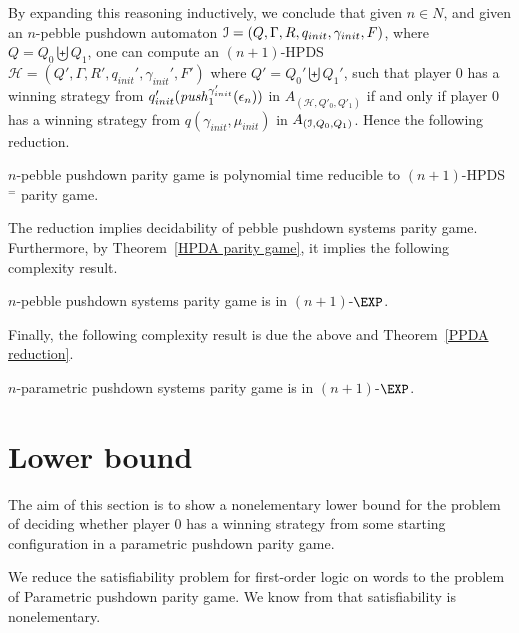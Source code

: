 \documentclass[a4paper,UKenglish,cleveref, autoref, thm-restate]{lipics-v2021}
\renewcommand{\H}{\mathcal{H}}
\begin{document}
{By expanding this reasoning inductively, we conclude that given $n \in N$, and
given an $n$-pebble pushdown automaton 
$\mathcal{I} = (Q, \Gamma, R, q_{init}, \gamma_{init}, F)$, where $Q= Q_0 \biguplus Q_1$,
one can compute an $(n+1)$-HPDS 
$\H = (Q', \Gamma, R', q_{init}', \gamma_{init}', F')$  where $Q'= Q_0' \biguplus Q_1'$, 
such 
that 
player $0$ has a winning strategy from $q'_{init}(\text{\textit{push}}_1^{\gamma_{init}'}(\epsilon_{n}))$ in $A_{(\H,Q'_0,Q'_1)}$ 
if
and only if
player $0$ has a winning strategy from $q(\gamma_{init},\mu_{init})$ in $A_{(\mathcal{I},Q_0,Q_1)}$. 
Hence the following reduction.

\begin{theorem} 
{\sc $n$-pebble pushdown parity game} is polynomial time reducible
to {\sc $(n+1)$-HPDS$^=$ parity game}.
\end{theorem}

The reduction implies decidability of pebble pushdown systems parity game. Furthermore,
by Theorem~\ref{HPDA parity game}, it implies the following complexity result.


\begin{theorem}
{\sc $n$-pebble pushdown systems parity game} is in $(n+1)$-$\EXP$.
\end{theorem}

Finally, the following complexity result is due the above and Theorem~\ref{PPDA reduction}.

\begin{corollary}
{\sc $n$-parametric pushdown systems parity game} is in $(n+1)$-$\EXP$.
\end{corollary}













\section{Lower bound}

The aim of this section is to show a nonelementary lower bound for the 
problem of deciding whether player $0$ has a winning strategy from some starting configuration in
a parametric pushdown parity game.

We reduce the satisfiability problem for first-order logic on words
to the problem of {\sc Parametric pushdown parity game}. 
We know from \cite{Sto74}
that satisfiability is nonelementary. 
%

}
\end{document}
